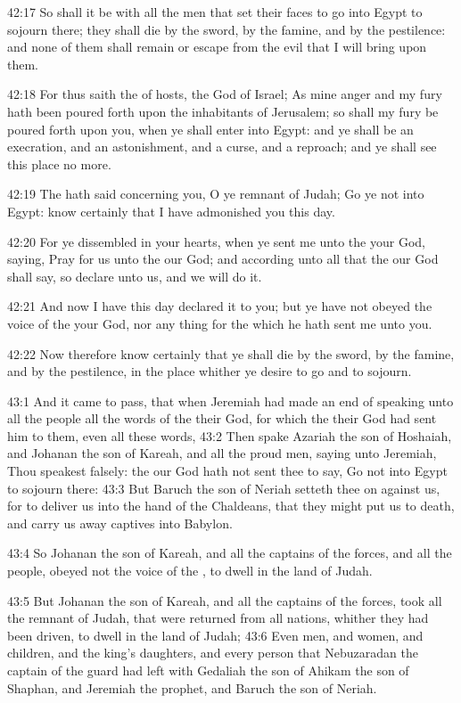 42:17 So shall it be with all the men that set their faces to go into
Egypt to sojourn there; they shall die by the sword, by the famine,
and by the pestilence: and none of them shall remain or escape from
the evil that I will bring upon them.

42:18 For thus saith the \LORD of hosts, the God of Israel; As mine
anger and my fury hath been poured forth upon the inhabitants of
Jerusalem; so shall my fury be poured forth upon you, when ye shall
enter into Egypt: and ye shall be an execration, and an astonishment,
and a curse, and a reproach; and ye shall see this place no more.

42:19 The \LORD hath said concerning you, O ye remnant of Judah; Go ye
not into Egypt: know certainly that I have admonished you this day.

42:20 For ye dissembled in your hearts, when ye sent me unto the \LORD
your God, saying, Pray for us unto the \LORD our God; and according
unto all that the \LORD our God shall say, so declare unto us, and we
will do it.

42:21 And now I have this day declared it to you; but ye have not
obeyed the voice of the \LORD your God, nor any thing for the which he
hath sent me unto you.

42:22 Now therefore know certainly that ye shall die by the sword, by
the famine, and by the pestilence, in the place whither ye desire to
go and to sojourn.

43:1 And it came to pass, that when Jeremiah had made an end of
speaking unto all the people all the words of the \LORD their God, for
which the \LORD their God had sent him to them, even all these words,
43:2 Then spake Azariah the son of Hoshaiah, and Johanan the son of
Kareah, and all the proud men, saying unto Jeremiah, Thou speakest
falsely: the \LORD our God hath not sent thee to say, Go not into Egypt
to sojourn there: 43:3 But Baruch the son of Neriah setteth thee on
against us, for to deliver us into the hand of the Chaldeans, that
they might put us to death, and carry us away captives into Babylon.

43:4 So Johanan the son of Kareah, and all the captains of the forces,
and all the people, obeyed not the voice of the \LORD, to dwell in the
land of Judah.

43:5 But Johanan the son of Kareah, and all the captains of the
forces, took all the remnant of Judah, that were returned from all
nations, whither they had been driven, to dwell in the land of Judah;
43:6 Even men, and women, and children, and the king's daughters, and
every person that Nebuzaradan the captain of the guard had left with
Gedaliah the son of Ahikam the son of Shaphan, and Jeremiah the
prophet, and Baruch the son of Neriah.

